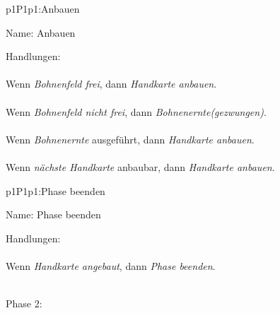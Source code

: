 \begin{description}[leftmargin=5em, style=sameline]
	
	\begin{lhp}{p1}{P1}{p1:Anbauen}
		\item [Name:] Anbauen
		\item [Handlungen:]\hfill\\ 
		\\Wenn {\itshape Bohnenfeld frei}, dann 
		{\itshape Handkarte anbauen}.\\
		\\Wenn {\itshape Bohnenfeld nicht frei}, dann 
		{\itshape Bohnenernte(gezwungen)}.\\
		\\Wenn {\itshape Bohnenernte} ausgeführt, dann 
		{\itshape Handkarte anbauen}.\\
		\\Wenn {\itshape nächste Handkarte} anbaubar, dann 
		{\itshape Handkarte anbauen}.\\
	\end{lhp}
	
	\begin{lhp}{p1}{P1}{p1:Phase beenden}
		\item [Name:] Phase beenden
		\item [Handlungen:]\hfill\\ 
		\\Wenn {\itshape Handkarte angebaut}, dann 
		{\itshape Phase beenden}.\\
	\end{lhp}	
\end{description}

\hfill\\ Phase 2:\\


